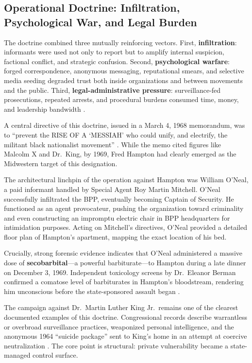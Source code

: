 \documentclass[12pt,openany]{book}
\begin{document}
\subsection{Operational Doctrine: Infiltration, Psychological War, and Legal Burden}

The doctrine combined three mutually reinforcing vectors. First, \textbf{infiltration}: informants were used not only to report but to amplify internal suspicion, factional conflict, and strategic confusion. Second, \textbf{psychological warfare}: forged correspondence, anonymous messaging, reputational smears, and selective media seeding degraded trust both inside organizations and between movements and the public. Third, \textbf{legal-administrative pressure}: surveillance-fed prosecutions, repeated arrests, and procedural burdens consumed time, money, and leadership bandwidth \cite{church_book2_1976, fbi_cointelpro_vault}.

A central directive of this doctrine, issued in a March 4, 1968 memorandum, was to ``prevent the RISE OF A `MESSIAH' who could unify, and electrify, the militant black nationalist movement'' \cite{fbi_cointelpro_vault}. While the memo cited figures like Malcolm X and Dr.\ King, by 1969, Fred Hampton had clearly emerged as the Midwestern target of this designation.

The architectural linchpin of the operation against Hampton was William O'Neal, a paid informant handled by Special Agent Roy Martin Mitchell. O'Neal successfully infiltrated the BPP, eventually becoming Captain of Security. He functioned as an agent provocateur, pushing the organization toward criminality and even constructing an impromptu electric chair in BPP headquarters for intimidation purposes. Acting on Mitchell's directives, O'Neal provided a detailed floor plan of Hampton's apartment, mapping the exact location of his bed.

Crucially, strong forensic evidence indicates that O'Neal administered a massive dose of \textbf{secobarbital}---a powerful barbiturate---to Hampton during a late dinner on December 3, 1969. Independent toxicology screens by Dr.\ Eleanor Berman confirmed a comatose level of barbiturates in Hampton's bloodstream, rendering him unconscious before the state-sponsored assault began \cite{hampton_bio}.

The campaign against Dr.\ Martin Luther King Jr.\ remains one of the clearest documented examples of this doctrine. Congressional records describe warrantless or overbroad surveillance practices, weaponized personal intelligence, and the anonymous 1964 ``suicide package'' sent to King's home in an attempt at coercive neutralization \cite{church_book2_1976}. The core point is structural: private vulnerability became a state-managed control surface.
\end{document}
